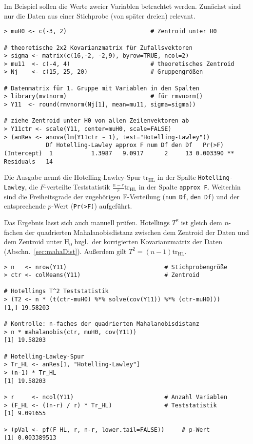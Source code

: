 Im Beispiel sollen die Werte zweier Variablen betrachtet werden. Zunächst sind nur die Daten aus einer Stichprobe (von später dreien) relevant.
\begin{lstlisting}
> muH0 <- c(-3, 2)                        # Zentroid unter H0
     
# theoretische 2x2 Kovarianzmatrix für Zufallsvektoren
> sigma <- matrix(c(16,-2, -2,9), byrow=TRUE, ncol=2)
> mu11  <- c(-4, 4)                       # theoretisches Zentroid
> Nj    <- c(15, 25, 20)                  # Gruppengrößen

# Datenmatrix für 1. Gruppe mit Variablen in den Spalten
> library(mvtnorm)                        # für rmvnorm()
> Y11  <- round(rmvnorm(Nj[1], mean=mu11, sigma=sigma))

# ziehe Zentroid unter H0 von allen Zeilenvektoren ab
> Y11ctr <- scale(Y11, center=muH0, scale=FALSE)
> (anRes <- anova(lm(Y11ctr ~ 1), test="Hotelling-Lawley"))
            Df Hotelling-Lawley approx F num Df den Df   Pr(>F)
(Intercept)  1           1.3987   9.0917      2     13 0.003390 **
Residuals   14
\end{lstlisting}

Die Ausgabe nennt die Hotelling-Lawley-Spur $\text{tr}_{\text{HL}}$ in der Spalte \lstinline!Hotelling-Lawley!, die $F$-verteilte Teststatistik $\frac{n-r}{r} \text{tr}_{\text{HL}}$ in der Spalte \lstinline!approx F!. Weiterhin sind die Freiheitsgrade der zugehörigen F-Verteilung (\lstinline!num Df!, \lstinline!den Df!) und der entsprechende $p$-Wert (\lstinline!Pr(>F)!) aufgeführt.

Das Ergebnis lässt sich auch manuell prüfen. Hotellings $T^{2}$ ist gleich dem $n$-fachen der quadrierten Mahalanobisdistanz zwischen dem Zentroid der Daten und dem Zentroid unter $\text{H}_{0}$ bzgl.\ der korrigierten Kovarianzmatrix der Daten (Abschn.\ \ref{sec:mahaDist}). Außerdem gilt $T^{2} = (n-1) \text{tr}_{\text{HL}}$.
\begin{lstlisting}
> n   <- nrow(Y11)                            # Stichprobengröße
> ctr <- colMeans(Y11)                        # Zentroid

# Hotellings T^2 Teststatistik
> (T2 <- n * (t(ctr-muH0) %*% solve(cov(Y11)) %*% (ctr-muH0)))
[1,] 19.58203

# Kontrolle: n-faches der quadrierten Mahalanobisdistanz
> n * mahalanobis(ctr, muH0, cov(Y11))
[1] 19.58203

# Hotelling-Lawley-Spur
> Tr_HL <- anRes[1, "Hotelling-Lawley"]
> (n-1) * Tr_HL
[1] 19.58203

> r     <- ncol(Y11)                          # Anzahl Variablen
> (F_HL <- ((n-r) / r) * Tr_HL)               # Teststatistik
[1] 9.091655

> (pVal <- pf(F_HL, r, n-r, lower.tail=FALSE))     # p-Wert
[1] 0.003389513
\end{lstlisting}


